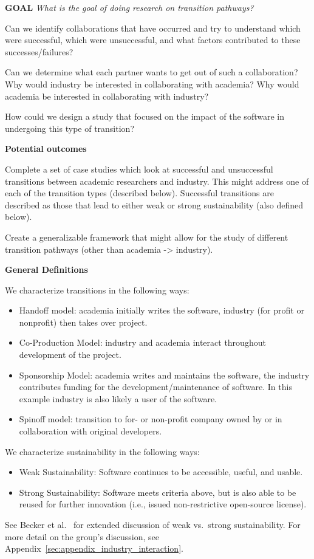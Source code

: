 \textbf{GOAL}
\emph{What is the goal of doing research on transition pathways?} 

Can we identify collaborations that have occurred and try to understand which were successful, which were unsuccessful, and what factors contributed to these successes/failures? 

Can we determine what each partner wants to get out of such a collaboration?
Why would industry be interested in collaborating with academia? 
Why would academia be interested in collaborating with industry?

How could we design a study that focused on the impact of the software in undergoing this type of transition?   

\textbf{Potential outcomes}

Complete a set of case studies which look at successful and unsuccessful transitions between academic researchers and industry.
This might address one of each of the transition types (described below).
Successful transitions are described as those that lead to either weak or strong sustainability (also defined below). 

Create a generalizable framework that might allow for the study of different transition pathways (other than academia -> industry). 

\textbf{General Definitions}

We characterize transitions in the following ways:
\begin{itemize}
\item Handoff model: academia initially writes the software, industry (for profit or nonprofit) then takes over project. 
\item Co-Production Model: industry and academia interact throughout development of the project.
\item Sponsorship Model: academia writes and maintains the software, the industry contributes funding for the development\slash maintenance of software. In this example industry is also likely a user of the software.
\item Spinoff model: transition to for- or non-profit company owned by or in collaboration with original developers. 
\end{itemize}

We characterize sustainability in the following ways:
\begin{itemize}
\item Weak Sustainability: Software continues to be accessible, useful, and usable. 
\item Strong Sustainability: Software meets criteria above, but is also able to be reused for further innovation (i.e., issued non-restrictive open-source license).
\end{itemize}
See Becker et al.~\cite{Becker:2014} for extended discussion of weak vs.\ strong sustainability.
For more detail on the group's discussion, see Appendix~\ref{sec:appendix_industry_interaction}.

